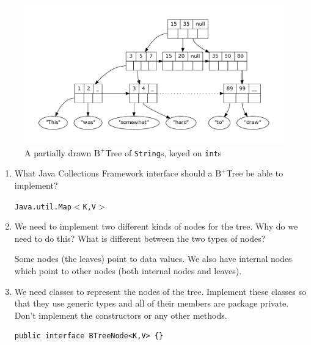 \documentclass[11pt]{article}
\newenvironment{answer}{\large\lstset{basicstyle=\tiny\ttfamily}\color{white}}{}
\newenvironment{answer}{\large\lstset{basicstyle=\large\ttfamily}\color{red}}{}
\begin{document}
\begin{enumerate}
\begin{figure}[h]
\caption{A partially drawn $\textrm{B}^+$Tree of \texttt{String}s, keyed on \texttt{int}s}
\label{b-tree}
\center
\includegraphics[width=5in]{b_plus_tree_dot.pdf}
\vspace{-1cm}
\end{figure}

    \begin{enumerate}
    \item What Java Collections Framework interface should a
    $\textrm{B}^+$Tree be able to implement?

        \begin{answer}
        \texttt{Java.util.Map$<$K,V$>$}
        \end{answer}
		\vspace{0.125in}

    \item We need to implement two different kinds of nodes for the tree. Why
    do we need to do this? What is different between the two types of nodes?

        \begin{answer}
        Some nodes (the leaves) point to data values. We also have internal
        nodes which point to other nodes (both internal nodes and leaves).
        \end{answer}
		\vspace{0.125in}

    \item We need classes to represent the nodes of the tree. Implement these
    classes so that they use generic types and all of their members are package
    private. Don't implement the constructors or any other methods.

\begin{answer}
\begin{lstlisting}
public interface BTreeNode<K,V> {}


\end{lstlisting}
\end{answer}
\end{enumerate}
\end{enumerate}
\end{document}

